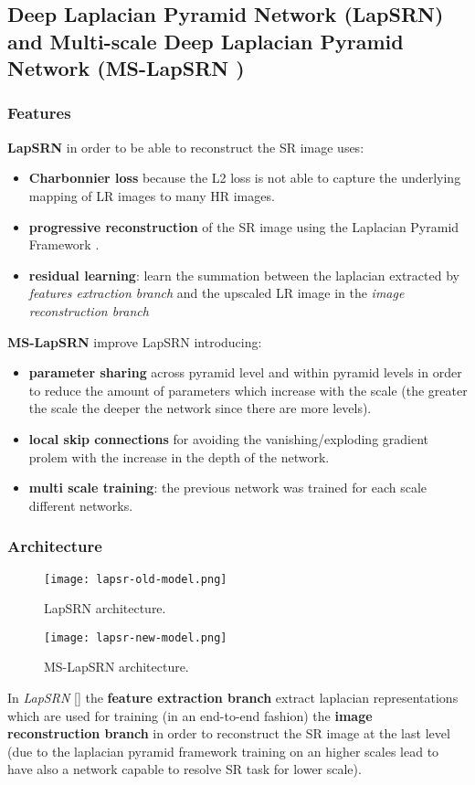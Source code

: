 \subsection{Deep Laplacian Pyramid Network (LapSRN\cite{LapSRN}) and Multi-scale Deep Laplacian Pyramid Network (MS-LapSRN \cite{MSLapSRN})}

\subsubsection{Features}
\textbf{LapSRN} in order to be able to reconstruct the SR image uses:
\begin{itemize}
    \item \textbf{Charbonnier loss} because the L2 loss is not able to capture the underlying mapping of LR images to many HR images.
    \item \textbf{progressive reconstruction} of the SR image using the Laplacian Pyramid 
    Framework \cite{laplacianpyramid}.
    \item \textbf{residual learning}: learn the summation between the laplacian extracted by \textit{features extraction branch} and the upscaled LR image in the \textit{image reconstruction branch}
\end{itemize}
\textbf{MS-LapSRN} improve LapSRN introducing:
\begin{itemize}
    \item \textbf{parameter sharing} across pyramid level and within pyramid levels in order to reduce the amount of parameters which increase with the scale (the greater the scale the deeper the network since there are more levels).
    \item \textbf{local skip connections} for avoiding the vanishing/exploding gradient prolem with the increase in the depth of the network.
    \item \textbf{multi scale training}: the previous network was trained for each scale different networks.
\end{itemize}

\subsubsection{Architecture}
\begin{figure}
    \centering
    \texttt{[image: lapsr-old-model.png]}
    \caption{LapSRN architecture.}\label{lapsrn:old}
\end{figure}

\begin{figure}
    \centering
    \texttt{[image: lapsr-new-model.png]}
    \caption{MS-LapSRN architecture.}\label{lapsrn:new}
\end{figure}
In \textit{LapSRN} [] the \textbf{feature extraction branch} extract laplacian representations which are used for training (in an end-to-end fashion) the \textbf{image reconstruction branch} in order to reconstruct the SR image at the last level (due to the laplacian pyramid framework training on an higher scales lead to have also a network capable to resolve SR task for lower scale).

